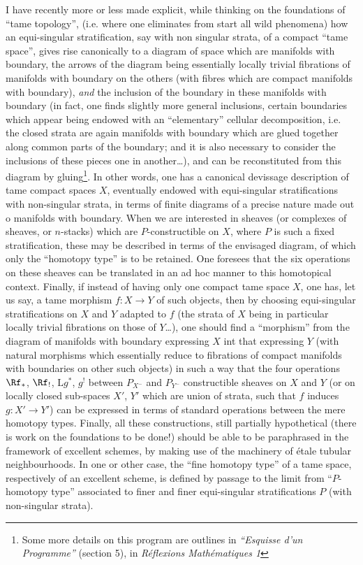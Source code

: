 I have recently more or less made explicit, while thinking on the foundations of ``tame topology'', (i.e. where one eliminates from start all wild phenomena) how an equi-singular stratification, say with non singular strata, of a compact ``tame space'', gives rise canonically to a diagram of space which are manifolds with boundary, the arrows of the diagram being essentially locally trivial fibrations of manifolds with boundary on the others (with fibres which are compact manifolds with boundary), \emph{and} the inclusion of the boundary in these manifolds with boundary (in fact, one finds slightly more general inclusions, certain boundaries which appear being endowed with an ``elementary'' cellular decomposition, i.e. the closed strata are again manifolds with boundary which are glued together along common parts of the boundary; and it is also necessary to consider the inclusions of these pieces one in another\dots), and can be reconstituted from this diagram by gluing\footnote{Some more details on this program are outlines in \emph{``Esquisse d'un Programme''} (section 5), in \emph{Réflexions Mathématiques 1}}. In other words, one has a canonical devissage description of tame compact spaces $X$, eventually endowed with equi-singular stratifications with non-singular strata, in terms of finite diagrams of a precise nature made out o manifolds with boundary. When we are interested in sheaves (or complexes of sheaves, or $n$-stacks) which are $P$-constructible on $X$, where $P$ is such a fixed stratification, these may be described in terms of the envisaged diagram, of which only the ``homotopy type'' is to be retained. One foresees that the six operations on these sheaves can be translated in an ad hoc manner to this homotopical context. Finally, if instead of having only one compact tame space $X$, one has, let us say, a tame morphism $f: X \to Y$ of such objects, then by choosing equi-singular stratifications on $X$ and $Y$ adapted to $f$ (the strata of $X$ being in particular locally trivial fibrations on those of $Y$\dots), one should find a ``morphism'' from the diagram of manifolds with boundary expressing $X$ int that expressing $Y$ (with natural morphisms which essentially reduce to fibrations of compact manifolds with boundaries on other such objects) in such a way that the four operations $\Rf_*$, $\Rf_!$, $\mathrm{L}g^*$, $g^!$ between $P_{X^-}$ and $P_{Y^-}$ constructible sheaves on $X$ and $Y$ (or on locally closed sub-spaces $X'$, $Y'$ which are union of strata, such that $f$ induces $g: X' \to Y'$) can be expressed in terms of standard operations between the mere homotopy types. Finally, all these constructions, still partially hypothetical (there is work on the foundations to be done!) should be able to be paraphrased in the framework of excellent schemes, by making use of the machinery of étale tubular neighbourhoods. In one or other case, the ``fine homotopy type'' of a tame space, respectively of an excellent scheme, is defined by passage to the limit from ``$P$-homotopy type'' associated to finer and finer equi-singular stratifications $P$ (with non-singular strata).

